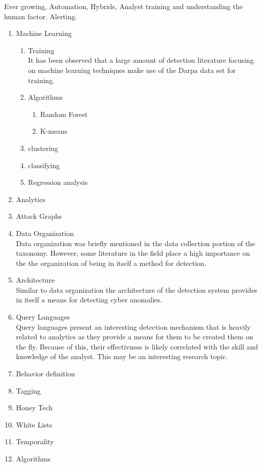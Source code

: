 \documentclass[conference]{IEEEtran}
\begin{document}
Ever growing, Automation, Hybrids, Analyst training and understanding the human factor. Alerting.
\begin{enumerate}
    \item Machine Learning\cite{buczak2016survey}\cite{dua2016data} 
    \begin{enumerate}
        \item Training\\
        It has been observed that a large amount of detection literature focusing on machine learning techniques make use of the Darpa data set for training. 
        \item Algorithms
        \begin{enumerate}
            \item Random Forest \cite{singh2014big}
            \item K-means\cite{asif2011filtering}\cite{hajamydeen2016unsupervised}
        \end{enumerate}
        \item clustering \cite{asif2011filtering}   
        \item classifying
        \item Regression analysis
    \end{enumerate}
    \item Analytics\cite{cardenas2013big}
    \item Attack Graphs\cite{abraham2015predictive}
    \item Data Organization
    \\ Data organization was briefly mentioned in the data collection portion of the taxonomy. However, some literature in the field place a high importance on the the organization of being in itself a method for detection.
    \item Architecture
    \\ Similar to data organization the architecture of the detection system provides in itself a means for detecting cyber anomalies.
    \item Query Languages\cite{mukherjee1994network}
    \\ Query languages present an interesting detection mechanism that is heavily related to analytics as they provide a means for them to be created them on the fly. Because of this, their effectivness is likely correlated with the skill and knowledge of the analyst. This may be an interesting research topic.
    \item Behavior definition
    \item Tagging
    \item Honey Tech \cite{jasek2013apt}\cite{saud2015towards}
    \item White Lists\cite{yen2013beehive}
    \item Temporality\cite{abraham2015predictive}\cite{abraham2014cyber}
    \item Algorithms\cite{kim2013detection}
\end{enumerate}
\end{document}
